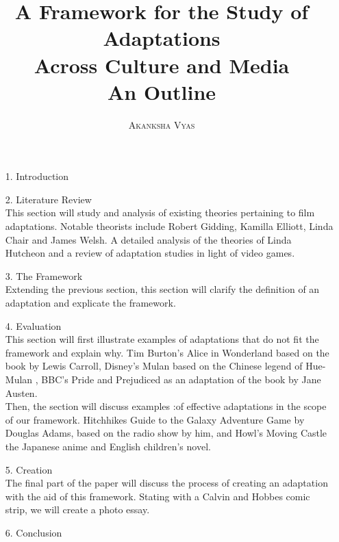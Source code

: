 \documentclass{article}[12pt]
\title{A Framework for the Study of Adaptations \\ Across Culture and Media \\ \small{An Outline}}
\author{\textsc{Akanksha Vyas}}
\date{}
\begin{document}
\maketitle
\begin{itemize}
\item[1. ] Introduction 
\item[2. ] Literature Review \\
This section will study and analysis of existing theories pertaining to film adaptations. Notable theorists include Robert Gidding, Kamilla Elliott, Linda Chair and James Welsh. A detailed analysis of the theories of Linda Hutcheon and a review of adaptation studies in light of video games. 
\item[3. ] The Framework \\
Extending the previous section, this section will clarify the definition of an adaptation and explicate the framework. 
\item[4. ] Evaluation \\
This section will first illustrate examples of adaptations that do not fit the framework and explain why. Tim Burton's Alice in Wonderland based on the book by Lewis Carroll, Disney's Mulan based on the Chinese legend of Hue-Mulan , BBC's Pride and Prejudiced as an adaptation of the book by Jane Austen. \\
Then, the section will discuss examples :of effective adaptations in the scope of our framework. Hitchhikes Guide to the Galaxy Adventure Game by Douglas Adams, based on the radio show by him, and Howl's Moving Castle the Japanese anime and English children's novel. 
\item[5. ] Creation \\
The final part of the paper will discuss the process of creating an adaptation with the aid of this framework. Stating with a Calvin and Hobbes comic strip, we will create a photo essay. 
\item[6. ] Conclusion
\end{itemize}
\end{document}
